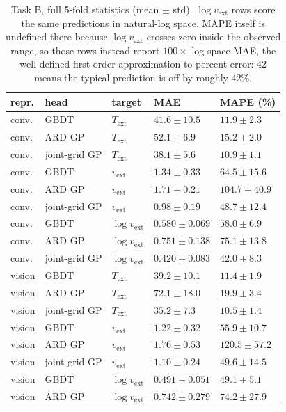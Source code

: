 \documentclass{article}
\newcommand{\Text}{T_{\mathrm{ext}}}
\newcommand{\vext}{v_{\mathrm{ext}}}
\begin{document}
\begin{table}[h]
  \caption{Task B, full 5-fold statistics (mean $\pm$ std). $\log\vext$ rows
  score the same predictions in natural-log space. MAPE itself is undefined
  there because $\log\vext$ crosses zero inside the observed range, so those
  rows instead report $100 \times$ log-space MAE, the well-defined
  first-order approximation to percent error: 42 means the typical prediction
  is off by roughly 42\%.}
  \label{tab:app_process}
  \centering\small
  \begin{tabularx}{\linewidth}{@{}lllXX@{}}
    \toprule
    repr. & head & target & MAE & MAPE (\%) \\
    \midrule
    conv. & GBDT & $\Text$ & $41.6 \pm 10.5$ & $11.9 \pm 2.3$ \\
    conv. & ARD GP & $\Text$ & $52.1 \pm 6.9$ & $15.2 \pm 2.0$ \\
    conv. & joint-grid GP & $\Text$ & $38.1 \pm 5.6$ & $10.9 \pm 1.1$ \\
    conv. & GBDT & $\vext$ & $1.34 \pm 0.33$ & $64.5 \pm 15.6$ \\
    conv. & ARD GP & $\vext$ & $1.71 \pm 0.21$ & $104.7 \pm 40.9$ \\
    conv. & joint-grid GP & $\vext$ & $0.98 \pm 0.19$ & $48.7 \pm 12.4$ \\
    conv. & GBDT & $\log\vext$ & $0.580 \pm 0.069$ & $58.0 \pm 6.9$ \\
    conv. & ARD GP & $\log\vext$ & $0.751 \pm 0.138$ & $75.1 \pm 13.8$ \\
    conv. & joint-grid GP & $\log\vext$ & $0.420 \pm 0.083$ & $42.0 \pm 8.3$ \\
    \midrule
    vision & GBDT & $\Text$ & $39.2 \pm 10.1$ & $11.4 \pm 1.9$ \\
    vision & ARD GP & $\Text$ & $72.1 \pm 18.0$ & $19.9 \pm 3.4$ \\
    vision & joint-grid GP & $\Text$ & $35.2 \pm 7.3$ & $10.5 \pm 1.4$ \\
    vision & GBDT & $\vext$ & $1.22 \pm 0.32$ & $55.9 \pm 10.7$ \\
    vision & ARD GP & $\vext$ & $1.76 \pm 0.53$ & $120.5 \pm 57.2$ \\
    vision & joint-grid GP & $\vext$ & $1.10 \pm 0.24$ & $49.6 \pm 14.5$ \\
    vision & GBDT & $\log\vext$ & $0.491 \pm 0.051$ & $49.1 \pm 5.1$ \\
    vision & ARD GP & $\log\vext$ & $0.742 \pm 0.279$ & $74.2 \pm 27.9$ \\

\end{tabularx}
\end{table}
\end{document}
